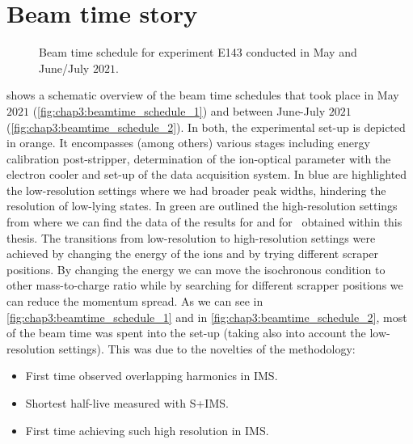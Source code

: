 \section{Beam time story}\label{sec:chap3:beamtimestory}
\begin{figure}[h] %
  \centering
  \hspace{0.5cm}
  \caption{Beam time schedule for experiment \textsc{E143} conducted in May and June/July $2021$.}
  \label{fig:chap3:beamtime_schedule}
\end{figure}
 shows a schematic overview of the beam time schedules that took place in May $2021$ (\cref{fig:chap3:beamtime_schedule_1}) and between June-July $2021$ (\cref{fig:chap3:beamtime_schedule_2}). In both, the experimental set-up is depicted in orange. It encompasses (among others) various stages including energy calibration post-stripper, determination of the \gt ion-optical parameter with the electron cooler and set-up of the data acquisition system. In blue are highlighted the low-resolution settings where we had broader peak widths, hindering the resolution of low-lying states. In green are outlined the high-resolution settings from where we can find the data of the results for \germanium and for \, obtained within this thesis.
\newpar
The transitions from low-resolution to high-resolution settings were achieved by changing the energy of the ions and by trying different scraper positions. By changing the energy we can move the isochronous condition to other mass-to-charge ratio while by searching for different scrapper positions we can reduce the momentum spread.
\newpar
As we can see in \cref{fig:chap3:beamtime_schedule_1} and in \cref{fig:chap3:beamtime_schedule_2}, most of the beam time was spent into the set-up (taking also into account the low-resolution settings). This was due to the novelties of the methodology:
\begin{itemize}
  \item First time observed overlapping harmonics in \textsc{IMS}.
  \item Shortest half-live measured with \textsc{S+IMS}.
  \item First time achieving such high resolution in \textsc{IMS}.
\end{itemize}



